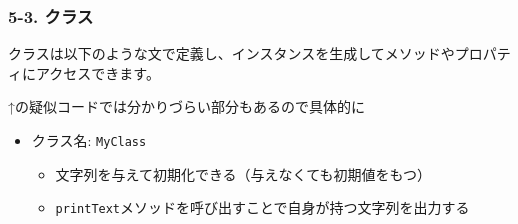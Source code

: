 \subsubsection{5-3. クラス}\label{ux30afux30e9ux30b9}

クラスは以下のような文で定義し、インスタンスを生成してメソッドやプロパティにアクセスできます。

\begin{Shaded}
\begin{Highlighting}[]
 \OperatorTok{\textless{}}\OperatorTok{\textgreater{}}\NormalTok{ \{}
  \OperatorTok{\textless{}}\OperatorTok{\textgreater{}}

  \NormalTok{ (}\OperatorTok{\textless{}}\OperatorTok{\textgreater{}}\NormalTok{) \{}
    \OperatorTok{\textless{}}\OperatorTok{\textgreater{}}
    \OperatorTok{\textless{}}\OperatorTok{\textgreater{}}
\NormalTok{  \}}

  \OperatorTok{\textless{}}\OperatorTok{\textgreater{}}
\NormalTok{\}}

\OperatorTok{\textless{}}\OperatorTok{\textgreater{}} \OperatorTok{\textless{}}\OperatorTok{\textgreater{}} \OperatorTok{=}  \OperatorTok{\textless{}}\OperatorTok{\textgreater{}}\NormalTok{(}\OperatorTok{\textless{}}\OperatorTok{\textgreater{}}\NormalTok{)}\OperatorTok{;}

\OperatorTok{\textless{}}\OperatorTok{\textgreater{}}
\end{Highlighting}
\end{Shaded}

↑の疑似コードでは分かりづらい部分もあるので具体的に

\begin{itemize}
\tightlist
\item
  クラス名: \texttt{MyClass}

  \begin{itemize}
  \tightlist
  \item
    文字列を与えて初期化できる（与えなくても初期値をもつ）
  \item
    \texttt{printText}メソッドを呼び出すことで自身が持つ文字列を出力する
  \end{itemize}
\end{itemize}

